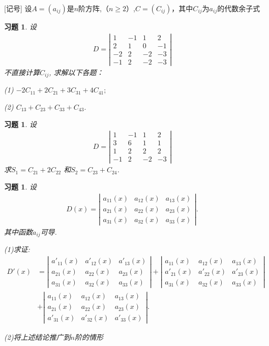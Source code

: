 \documentclass[UTF8]{ctexart}
\newtheorem{ex}[thm]{习题}
\begin{document}
[记号] 设$A=(a_{ij})$是$n$阶方阵,（$n\geq 2$）,$C=(C_{ij})$，其中$C_{ij}$为$a_{ij}$的代数余子式
\begin{ex}
设
\begin{eqnarray*}
D=\left |
\begin{array}{cccc}
 1 &-1 &1 &2\\
 2 &1 &0 &-1\\
 -2 & 2 &-2 &-3\\
 -1 &2 &-2 &-3
\end{array} \right|
\end{eqnarray*}
不直接计算$C_{ij}$, 求解以下各题：

(1) $-2C_{11}+2C_{21}+3C_{31}+4C_{41};$

(2) $C_{13}+C_{23}+C_{33}+C_{43}.$
\end{ex}

\begin{ex}
设
\begin{eqnarray*}
 D=\left |
\begin{array}{cccc}
1 &-1 &1 &2 \\ 3 &6 &1 &1\\ 1 &2 &2 &2\\ -1 &2 & -2& -3
\end{array}
\right |
\end{eqnarray*} 求$S_1=C_{21}+2C_{22}$ 和$S_2=C_{23}+C_{24}$.
\end{ex}



\begin{ex}
设
\begin{eqnarray*}
D(x)=\left|
\begin{array}{ccc}
a_{11}(x) &a_{12}(x) &a_{13}(x)\\
a_{21}(x) &a_{22}(x) &a_{23}(x)\\
a_{31}(x) &a_{32}(x) &a_{33}(x)
\end{array}
\right|.
\end{eqnarray*}
其中函数$a_{ij}$可导.

(1)求证:\begin{eqnarray*}
D'(x)&=\left|
\begin{array}{ccc}
a'_{11}(x) &a'_{12}(x) &a'_{13}(x)\\
a_{21}(x) &a_{22}(x) &a_{23}(x)\\
a_{31}(x) &a_{32}(x) &a_{33}(x)
\end{array}
\right|+\left|
\begin{array}{ccc}
a_{11}(x) &a_{12}(x) &a_{13}(x)\\
a'_{21}(x) &a'_{22}(x) &a'_{23}(x)\\
a_{31}(x) &a_{32}(x) &a_{33}(x)
\end{array}
\right|\\&+\left|
\begin{array}{ccc}
a_{11}(x) &a_{12}(x) &a_{13}(x)\\
a_{21}(x) &a_{22}(x) &a_{23}(x)\\
a'_{31}(x) &a'_{32}(x) &a'_{33}(x)
\end{array}
\right|.
\end{eqnarray*}

(2)将上述结论推广到$n$阶的情形

\end{ex}
\end{document}
